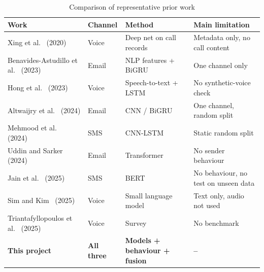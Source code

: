 {\begin{table}[H]
\caption{Comparison of representative prior work}
\label{tab:related}
\centering\small{}
\begin{tabular}{|p{3.7cm}|p{1.5cm}|p{3.3cm}|p{5.3cm}|}
\hline
\textbf{Work} & \textbf{Channel} & \textbf{Method} & \textbf{Main limitation} \\ \hline
Xing et al.~\cite{xing2020fraudcall} (2020) & Voice & Deep net on call records & Metadata only, no call content \\ \hline
Benavides-Astudillo et al.~\cite{benavides2023phishing} (2023) & Email & NLP features + BiGRU & One channel only \\ \hline
Hong et al.~\cite{hong2023scamcalls} (2023) & Voice & Speech-to-text + LSTM & No synthetic-voice check \\ \hline
Altwaijry et al.~\cite{altwaijry2024advancing} (2024) & Email & CNN / BiGRU & One channel, random split \\ \hline
Mehmood et al.~\cite{mehmood2024smishing} (2024) & SMS & CNN-LSTM & Static random split \\ \hline
Uddin and Sarker~\cite{uddin2024explainable} (2024) & Email & Transformer & No sender behaviour \\ \hline
Jain et al.~\cite{jain2025smishing} (2025) & SMS & BERT & No behaviour, no test on unseen data \\ \hline
Sim and Kim~\cite{sim2025slm} (2025) & Voice & Small language model & Text only, audio not used \\ \hline
Triantafyllopoulos et al.~\cite{triantafyllopoulos2025vishing} (2025) & Voice & Survey & No benchmark \\ \hline
\textbf{This project} & \textbf{All three} & \textbf{Models + behaviour + fusion} & \textbf{--} \\ \hline
\end{tabular}
\end{table}

}
